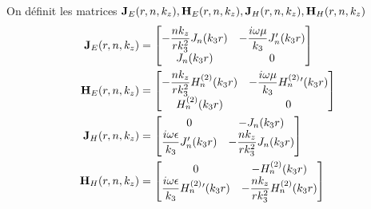     \newcommand{\mJ}{\mat{J}}
    \newcommand{\mH}{\mat{H}}

    \begin{defn}
        On définit les matrices \(\mJ_{E}(r,n,k_z),\mH_{E}(r,n,k_z),\mJ_{H}(r,n,k_z),\mH_{H}(r,n,k_z)\)
        \begin{align}
            \mJ_{E}(r,n,k_z) &= 
            \begin{bmatrix}
                -\frac{nk_z}{rk_3^2}J_n(k_3r) & -\frac{i\w\mu}{k_3}J_n'(k_3r)
                \\
                J_n(k_3r) & 0
            \end{bmatrix}
            \\
            \mH_{E}(r,n,k_z) &= 
            \begin{bmatrix}
                -\frac{nk_z}{rk_3^2}H_n^{(2)}(k_3r) & -\frac{i\w\mu}{k_3}H_n^{(2)}{}'(k_3r)
                \\
                H_n^{(2)}(k_3r) & 0
            \end{bmatrix}
            \\
            \mJ_{H}(r,n,k_z) &= 
            \begin{bmatrix}
                0 & -J_n(k_3r)
                \\
                \frac{i\w\eps}{k_3}J_n'(k_3r) & -\frac{nk_z}{rk_3^2}J_n(k_3r)
            \end{bmatrix}
            \\
            \mH_{H}(r,n,k_z) &= 
            \begin{bmatrix}
                0 & -H_n^{(2)}(k_3r)
                \\
                \frac{i\w\eps}{k_3}H_n^{(2)}{}'(k_3r) & -\frac{nk_z}{rk_3^2}H_n^{(2)}(k_3r)
            \end{bmatrix}
        \end{align}
    \end{defn}

